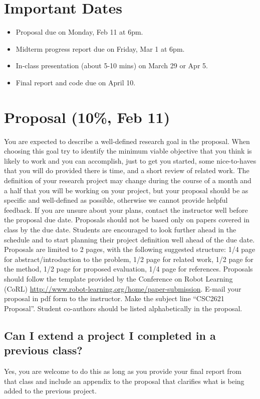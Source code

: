 \documentclass[a4paper,10pt]{article}
\begin{document}
\section{Important Dates}

\begin{itemize}
 \item Proposal due on Monday, Feb 11 at 6pm.  
 \item Midterm progress report due on Friday, Mar 1 at 6pm.
 \item In-class presentation (about 5-10 mins) on March 29 or Apr 5.
 \item Final report and code due on April 10. 
\end{itemize}

\section{Proposal (10\%, Feb 11)}

You are expected to describe a well-defined research goal in the proposal. When choosing this goal try to identify the minimum viable objective that you think is likely to work and you can accomplish, 
just to get you started, some nice-to-haves that you will do provided there is time, and a short review of related work. The definition of your research project may change during the
course of a month and a half that you will be working on your project, but your proposal should be as specific and well-defined as possible, otherwise we cannot provide helpful feedback. If you are unsure
about your plans, contact the instructor well before the proposal due date. Proposals should not be based only on papers covered in class by the due date. Students are encouraged to look further ahead in 
the schedule and to start planning their project definition well ahead of the due date. 
\newline
\newline
Proposals are limited to 2 pages, with the following suggested structure: 1/4 page for abstract/introduction to the problem, 1/2 page for related work, 1/2 page for the method, 
1/2 page for proposed evaluation, 1/4 page for references. Proposals should follow the template provided by the Conference on Robot Learning (CoRL) \url{http://www.robot-learning.org/home/paper-submission}. 
E-mail your proposal in pdf form to the instructor. Make the subject line ``CSC2621 Proposal''. Student co-authors should be listed alphabetically in the proposal.  

\subsection{Can I extend a project I completed in a previous class?}
Yes, you are welcome to do this as long as you provide your final report from that class and include an appendix to the proposal that clarifies what is being added to the previous project.  
\end{document}
